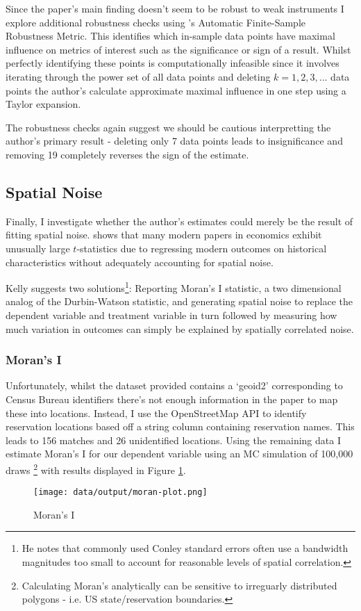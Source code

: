 \documentclass[12pt]{article}
\begin{document}
Since the paper's main finding doesn't seem to be robust to weak instruments I explore additional robustness checks using 
\cite{amip}'s Automatic Finite-Sample Robustness Metric. This identifies which in-sample data points have maximal influence on 
 metrics of interest such as the significance or sign of a result. Whilst perfectly identifying these points is computationally infeasible
since it involves iterating through the power set of all data points and deleting $k = 1, 2, 3, ...$ data points the author's calculate approximate 
maximal influence in one step using a Taylor expansion.





The robustness checks again suggest we should be cautious interpretting the author's primary result - deleting only 7 data points leads to insignificance and 
removing 19 completely reverses the sign of the estimate.

\subsection{Spatial Noise}
Finally, I investigate whether the author's estimates could merely be the result of fitting spatial noise. \cite{persistence} shows that many modern 
papers in economics exhibit unusually large $t$-statistics due to regressing modern outcomes on historical characteristics without adequately accounting for 
spatial noise. 

Kelly suggests two solutions\footnote{He notes that commonly used Conley standard errors often use a bandwidth magnitudes too small to account for reasonable levels of spatial correlation.}: Reporting Moran's I statistic, a two dimensional analog of the Durbin-Watson statistic,
 and  generating spatial noise to replace the dependent variable and treatment variable in turn followed by measuring how much variation in outcomes can simply be explained by spatially correlated noise.

\subsubsection*{Moran's I}
Unfortunately, whilst the dataset provided contains a `geoid2' corresponding to Census Bureau identifiers there's not enough information in the paper to map these 
into locations. Instead, I use the OpenStreetMap API \citep{OpenStreetMap} to identify reservation locations based off a string column containing reservation names. This leads 
to 156 matches and  26 unidentified locations. Using the remaining data I estimate Moran's I for our dependent variable using an MC simulation of 100,000 draws \footnote{Calculating Moran's analytically can be sensitive to irreguarly distributed polygons - i.e. US state/reservation boundaries.}
with  results displayed in Figure \ref{moran}.
\begin{figure}[htbp]
    \centering
    \texttt{[image: data/output/moran-plot.png]}
    \caption{Moran's I}
    \label{moran}
\end{figure}
\end{document}
